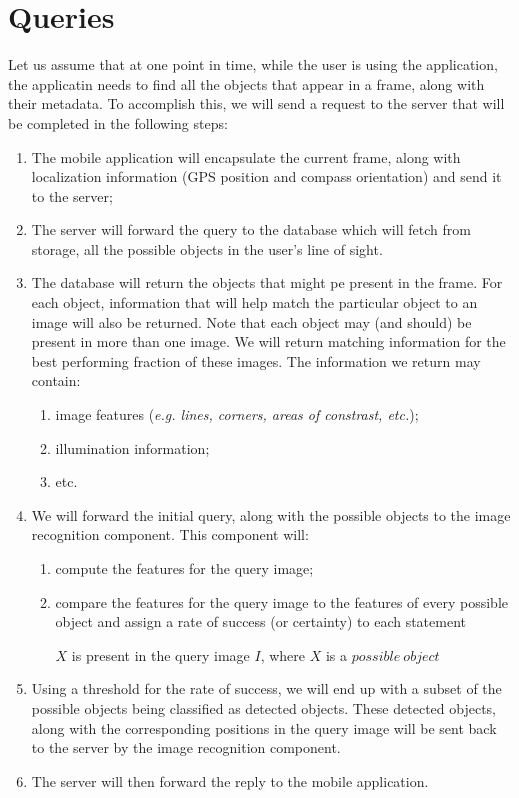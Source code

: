 \documentclass[a4paper,onecolumn,oneside,titlepage,12pt]{report}
\begin{document}
\section{Queries}
Let us assume that at one point in time, while the user is using the application, the applicatin needs to find all the objects that appear in a frame, along with their metadata. To accomplish this, we will send a request to the server that will be completed in the following steps:
\begin{enumerate}
	\item The mobile application will encapsulate the current frame, along with localization information (GPS position and compass orientation) and send it to the server;
	\item The server will forward the query to the database which will fetch from storage, all the possible objects in the user's line of sight.
	\item The database will return the objects that might pe present in the frame. For each object, information that will help match the particular object to an image will also be returned. Note that each object may (and should) be present in more than one image. We will return matching information for the best performing fraction of these images. The information we return may contain:
	\begin{enumerate}
		\item image features (\emph{e.g. lines, corners, areas of constrast, etc.});
		\item illumination information;
		\item etc.
	\end{enumerate}
	\item We will forward the initial query, along with the possible objects to the image recognition component. This component will:
		\begin{enumerate}
			\item compute the features for the query image;
			\item compare the features for the query image to the features of every possible object and assign a rate of success (or certainty) to each statement
			
			$X$ is present in the query image $I$, where $X$ is a $possible\:object$
		\end{enumerate}
		\item Using a threshold for the rate of success, we will end up with a subset of the possible objects being classified as detected objects. These detected objects, along with the corresponding positions in the query image will be sent back to the server by the image recognition component.
		\item The server will then forward the reply to the mobile application.
\end{enumerate}
\end{document}
